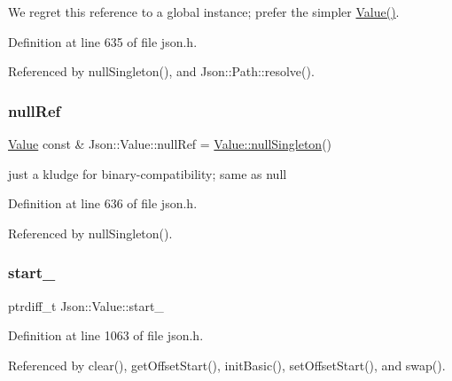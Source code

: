 We regret this reference to a global instance; prefer the simpler \hyperlink{class_json_1_1_value_ada6ba1369448fb0240bccc36efaa46f7}{Value()}. 



Definition at line 635 of file json.\+h.



Referenced by null\+Singleton(), and Json\+::\+Path\+::resolve().

\mbox{\label{class_json_1_1_value_aaee27e622f87266f861216d644603730}} 
\subsubsection{\texorpdfstring{null\+Ref}{nullRef}}
{\footnotesize\ttfamily \hyperlink{class_json_1_1_value}{Value} const  \& Json\+::\+Value\+::null\+Ref = \hyperlink{class_json_1_1_value_af2f124567acc35d021a424e53ebdfcab}{Value\+::null\+Singleton}()\hspace{0.3cm}{\ttfamily [static]}}



just a kludge for binary-\/compatibility; same as null 



Definition at line 636 of file json.\+h.



Referenced by null\+Singleton().

\mbox{\label{class_json_1_1_value_a1c3aeb0fa8fefe93776cb347c76a25a8}} 
\subsubsection{\texorpdfstring{start\+\_\+}{start\_}}
{\footnotesize\ttfamily ptrdiff\+\_\+t Json\+::\+Value\+::start\+\_\+\hspace{0.3cm}{\ttfamily [private]}}



Definition at line 1063 of file json.\+h.



Referenced by clear(), get\+Offset\+Start(), init\+Basic(), set\+Offset\+Start(), and swap().

